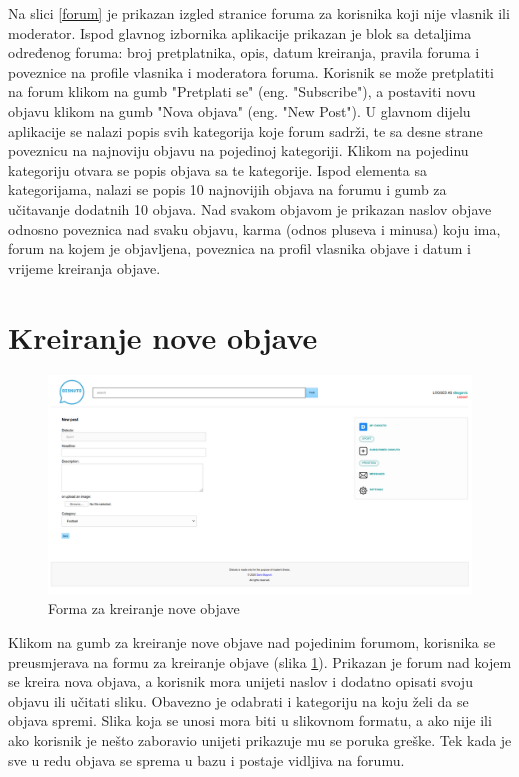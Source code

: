 \documentclass{foi}
\begin{document}
Na slici \ref{forum} je prikazan izgled stranice foruma za korisnika koji nije vlasnik ili moderator. Ispod glavnog izbornika aplikacije prikazan je blok sa detaljima određenog foruma: broj pretplatnika, opis, datum kreiranja, pravila foruma i poveznice na profile vlasnika i moderatora foruma.  Korisnik se može pretplatiti na forum klikom na gumb "Pretplati se" (eng. "Subscribe"), a postaviti novu objavu klikom na gumb "Nova objava" (eng. "New Post"). U glavnom dijelu aplikacije se nalazi popis svih kategorija koje forum sadrži, te sa desne strane poveznicu na najnoviju objavu na pojedinoj kategoriji. Klikom na pojedinu kategoriju otvara se popis objava sa te kategorije. Ispod elementa sa kategorijama, nalazi se popis 10 najnovijih objava na forumu i gumb za učitavanje dodatnih 10 objava. Nad svakom objavom je prikazan naslov objave odnosno poveznica nad svaku objavu, karma (odnos pluseva i minusa) koju ima, forum na kojem je objavljena, poveznica na profil vlasnika objave i datum i vrijeme kreiranja objave.

\section{Kreiranje nove objave}

\begin{figure}[h!]
    \centering
    \includegraphics[width=1\textwidth]{slike/nova-objava.png}
    \caption{Forma za kreiranje nove objave}
    \label{nova-objava}
\end{figure}

Klikom na gumb za kreiranje nove objave nad pojedinim forumom, korisnika se preusmjerava na formu za kreiranje objave (slika \ref{nova-objava}). Prikazan je forum nad kojem se kreira nova objava, a korisnik mora unijeti naslov i dodatno opisati svoju objavu ili učitati sliku. Obavezno je odabrati i kategoriju na koju želi da se objava spremi. Slika koja se unosi mora biti u slikovnom formatu, a ako nije ili ako korisnik je nešto zaboravio unijeti prikazuje mu se poruka greške. Tek kada je sve u redu objava se sprema u bazu i postaje vidljiva na forumu.
\end{document}
